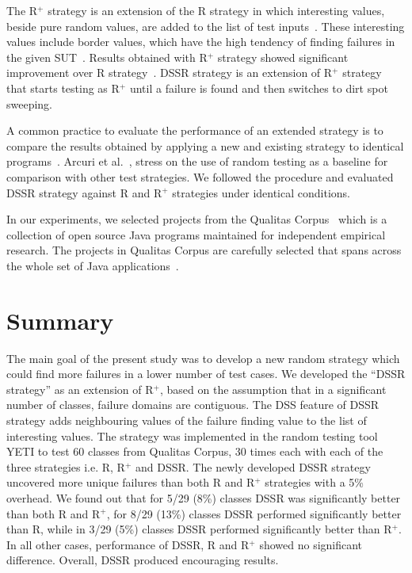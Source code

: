 The R$^+$ strategy is an extension of the R strategy in which interesting values, beside pure random values, are added to the list of test inputs~\cite{ciupa2007experimental, ciupa2008finding}. These interesting values include border values, which have the high tendency of finding failures in the given SUT~\cite{beizer2003software}. Results obtained with R$^+$ strategy showed significant improvement over R strategy~\cite{leitner2007reconciling}. DSSR strategy is an extension of R$^+$ strategy that starts testing as R$^+$ until a failure is found and then switches to dirt spot sweeping.



A common practice to evaluate the performance of an extended strategy is to compare the results obtained by applying a new and existing strategy to identical programs~\cite{hamlet1990partition, duran1984evaluation, gutjahr1999partition}. Arcuri et al.~\cite{arcuri2012random}, stress on the use of random testing as a baseline for comparison with other test strategies. We followed the procedure and evaluated DSSR strategy against R and R$^+$ strategies under identical conditions.

In our experiments, we selected projects from the Qualitas Corpus~\cite{tempero2010qualitas} which is a collection of open source Java programs maintained for independent empirical research. The projects in Qualitas Corpus are carefully selected that spans across the whole set of Java applications~\cite{oriol2012random, tempero2010empirical, tempero2008empirical}.




\section{Summary}\label{sec:conc}
The main goal of the present study was to develop a new random strategy which could find more failures in a lower number of test cases. We developed the ``DSSR strategy'' as an extension of R$^+$, based on the assumption that in a significant number of classes, failure domains are contiguous. The DSS feature of DSSR strategy adds neighbouring values of the failure finding value to the list of interesting values. The strategy was implemented in the random testing tool YETI to test 60 classes from Qualitas Corpus, 30 times each with each of the three strategies i.e. R, R$^+$ and DSSR. The newly developed DSSR strategy uncovered more unique failures than both R and R$^+$ strategies with a 5\% overhead. We found out that for 5/29 (8\%) classes DSSR was significantly better than both R and R$^+$, for 8/29 (13\%) classes DSSR performed significantly better than R, while in 3/29 (5\%) classes DSSR performed significantly better than R$^+$. In all other cases, performance of DSSR, R and R$^+$ showed no significant difference. Overall, DSSR produced encouraging results. 

